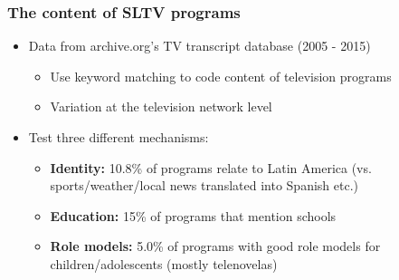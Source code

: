 \documentclass{beamer}
\begin{document}
\begin{frame}
\frametitle{The content of SLTV programs}
\begin{itemize}
  \setlength\itemsep{2em}
\item Data from archive.org's TV transcript database (2005 - 2015)
\begin{itemize}
\item Use keyword matching to code content of television programs
\item Variation at the television network level
\end{itemize}
\item Test three different mechanisms:
\vspace{0.6em}
\begin{itemize}
  \setlength\itemsep{0.6em}
\item \textbf{Identity:} 10.8\% of programs relate to Latin America (vs. sports/weather/local news translated into Spanish etc.)
\item \textbf{Education:} 15\% of programs that mention schools
\item \textbf{Role models:} 5.0\% of programs with good role models for children/adolescents (mostly telenovelas)
\end{itemize}
\end{itemize}
\end{frame}
\end{document}
